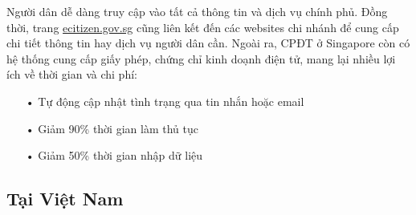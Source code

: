 \documentclass[a4paper]{article}
\begin{document}
Người dân dễ dàng truy cập vào tất cả thông tin và dịch vụ chính phủ. Đồng thời, trang \href{ecitizen.gov.sg}{ecitizen.gov.sg} cũng liên kết đến các websites chi nhánh để cung cấp chi tiết thông tin hay dịch vụ người dân cần. 
Ngoài ra, CPĐT ở Singapore còn có hệ thống cung cấp giấy phép, chứng chỉ kinh doạnh điện tử, mang lại nhiều lợi ích về thời gian và chi phí:
	\begin{itemize}
	\item[•]Tự động cập nhật tình trạng qua tin nhắn hoặc email
	\item[•]Giảm 90\% thời gian làm thủ tục
	\item[•]Giảm 50\% thời gian nhập dữ liệu  
	\end{itemize}
\subsection{Tại Việt Nam}
\end{document}
